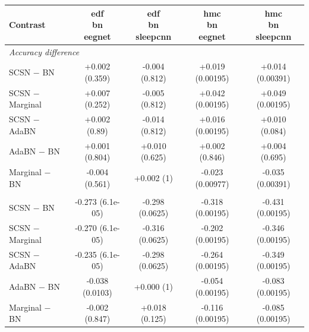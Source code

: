 \begin{tabular}{lcccc}
\toprule
Contrast & \shortstack{edf\\bn\\eegnet} & \shortstack{edf\\bn\\sleepcnn} & \shortstack{hmc\\bn\\eegnet} & \shortstack{hmc\\bn\\sleepcnn} \\
\midrule
\multicolumn{5}{l}{\emph{Accuracy difference}} \\
SCSN $-$ BN & +0.002 (0.359) & -0.004 (0.812) & +0.019 (0.00195) & +0.014 (0.00391) \\
SCSN $-$ Marginal & +0.007 (0.252) & -0.005 (0.812) & +0.042 (0.00195) & +0.049 (0.00195) \\
SCSN $-$ AdaBN & +0.002 (0.89) & -0.014 (0.812) & +0.016 (0.00195) & +0.010 (0.084) \\
AdaBN $-$ BN & +0.001 (0.804) & +0.010 (0.625) & +0.002 (0.846) & +0.004 (0.695) \\
Marginal $-$ BN & -0.004 (0.561) & +0.002 (1) & -0.023 (0.00977) & -0.035 (0.00391) \\
\addlinespace
\multicolumn{5}{l}{\emph{Within-stage probe difference}} \\
SCSN $-$ BN & -0.273 (6.1e-05) & -0.298 (0.0625) & -0.318 (0.00195) & -0.431 (0.00195) \\
SCSN $-$ Marginal & -0.270 (6.1e-05) & -0.316 (0.0625) & -0.202 (0.00195) & -0.346 (0.00195) \\
SCSN $-$ AdaBN & -0.235 (6.1e-05) & -0.298 (0.0625) & -0.264 (0.00195) & -0.349 (0.00195) \\
AdaBN $-$ BN & -0.038 (0.0103) & +0.000 (1) & -0.054 (0.00195) & -0.083 (0.00195) \\
Marginal $-$ BN & -0.002 (0.847) & +0.018 (0.125) & -0.116 (0.00195) & -0.085 (0.00195) \\
\bottomrule
\end{tabular}
